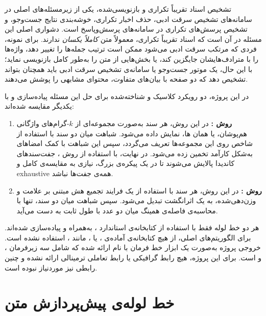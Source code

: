 \documentclass[11pt,a4paper]{article}
\begin{document}
	تشخیص اسناد تقریباً تکراری و بازنویسی‌شده، یکی از زیرمسئله‌های اصلی در سامانه‌های تشخیص سرقت ادبی، حذف اخبار تکراری، خوشه‌بندی نتایج جست‌وجو، و تشخیص پرسش‌های تکراری در سامانه‌های پرسش‌وپاسخ  است. دشواری اصلی این مسئله در آن است که اسناد تقریباً تکراری، معمولاً متن \emph{کاملاً یکسان} ندارند. برای نمونه، فردی که مرتکب سرقت ادبی می‌شود ممکن است ترتیب جمله‌ها را تغییر دهد، واژه‌ها را با مترادف‌هایشان جایگزین کند، یا بخش‌هایی از متن را به‌طور کامل بازنویسی نماید؛ با این حال، یک موتور جست‌وجو یا سامانه‌ی تشخیص سرقت ادبی باید همچنان بتواند تشخیص دهد که دو صفحه با بیان‌های متفاوت، محتوای مشابهی را پوشش می‌دهند.
	
	در این پروژه، دو رویکرد کلاسیک و شناخته‌شده برای حل این مسئله پیاده‌سازی و با یکدیگر مقایسه شده‌اند:
	
	\begin{enumerate}
		\item \textbf{روش :}
		در این روش، هر سند به‌صورت مجموعه‌ای از $k$-گرام‌های واژگانی هم‌پوشان، یا همان ها، نمایش داده می‌شود. شباهت میان دو سند با استفاده از شاخص  روی این مجموعه‌ها تعریف می‌گردد، سپس این شباهت با کمک امضاهای  به‌شکل کارآمد تخمین زده می‌شود. در نهایت، با استفاده از روش ، جفت‌سندهای کاندیدا پالایش می‌شوند تا در یک پیکره‌ی بزرگ، نیازی به مقایسه‌ی کامل و exhaustive همه‌ی جفت‌ها نباشد.
		
		\item \textbf{روش :}
		در این روش، هر سند با استفاده از یک فرایند تجمیع هش مبتنی بر علامت و وزن‌دهی‌شده، به یک اثرانگشت  تبدیل می‌شود. سپس شباهت میان دو سند، تنها با محاسبه‌ی فاصله‌ی همینگ میان دو عدد با طول ثابت به دست می‌آید.
	\end{enumerate}
	
	هر دو خط لوله فقط با استفاده از کتابخانه‌ی استاندارد ، به‌همراه  و  پیاده‌سازی شده‌اند. برای الگوریتم‌های اصلی، از هیچ کتابخانه‌ی آماده‌ی ،  یا ، مانند ، استفاده نشده است. خروجی پروژه به‌صورت یک ابزار خط فرمان با نام  ارائه شده که شامل سه زیرفرمان ،  و  است. برای این پروژه، هیچ رابط گرافیکی یا رابط تعاملی ترمینالی ارائه نشده و چنین رابطی نیز موردنیاز نبوده است.
	
	\section{خط لوله‌ی پیش‌پردازش متن}
	
\end{document}
